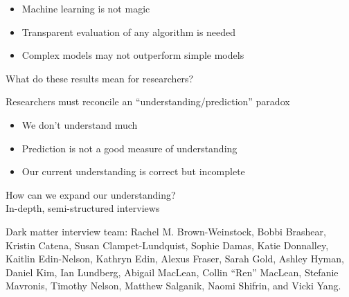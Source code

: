 \documentclass[aspectratio=169]{beamer}
\begin{document}
\begin{frame}

\begin{itemize}
\item Machine learning is not magic\pause
\item Transparent evaluation of any algorithm is needed \pause
\item Complex models may not outperform simple models
\end{itemize}

\end{frame}
\begin{frame}

\begin{center}
\Large{What do these results mean for researchers?}
\end{center}

\end{frame}
\begin{frame}

Researchers must reconcile an ``understanding/prediction'' paradox \pause
\begin{itemize}
\item We don't understand much \pause
\item Prediction is not a good measure of understanding \pause
\item Our current understanding is correct but incomplete
\end{itemize}

\end{frame}
\begin{frame}

\begin{center}
{\Large How can we expand our understanding?}\\ 
\vspace{0.5in}
\pause
{\Large In-depth, semi-structured interviews}
\end{center}

\vfill
Dark matter interview team: Rachel M. Brown-Weinstock, Bobbi Brashear, Kristin Catena, Susan Clampet-Lundquist, Sophie Damas, Katie Donnalley, Kaitlin Edin-Nelson, Kathryn Edin, Alexus Fraser, Sarah Gold, Ashley Hyman, Daniel Kim, Ian Lundberg, Abigail MacLean, Collin ``Ren'' MacLean, Stefanie Mavronis, Timothy Nelson, Matthew Salganik, Naomi Shifrin, and Vicki Yang.
\end{frame}
\end{document}
